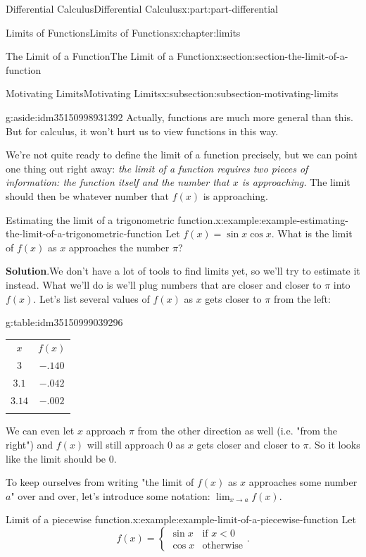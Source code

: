 \documentclass[twoside,10pt,]{tufte-book}
\newcommand{\blocktitlefont}{\relax}
\newcommand{\tabularfont}{\relax}
\numberwithin{equation}{part}
\newcommand{\hrulethin}  {\noalign{\hrule height 0.04em}}
\newcommand{\hrulethick} {\noalign{\hrule height 0.11em}}
\begin{document}
\begin{partptx}{Differential Calculus}{}{Differential Calculus}{}{}{x:part:part-differential}
\begin{chapterptx}{Limits of Functions}{}{Limits of Functions}{}{}{x:chapter:limits}
\begin{sectionptx}{The Limit of a Function}{}{The Limit of a Function}{}{}{x:section:section-the-limit-of-a-function}
\begin{subsectionptx}{Motivating Limits}{}{Motivating Limits}{}{}{x:subsection:subsection-motivating-limits}
\begin{aside}{}{g:aside:idm35150998931392}%
Actually, functions are much more general than this. But for calculus, it won't hurt us to view functions in this way.%
\end{aside}
We're not quite ready to define the limit of a function precisely, but we can point one thing out right away: \emph{the limit of a function requires two pieces of information: the function itself and the number that \(x\) is approaching.} The limit should then be whatever number that \(f(x)\) is approaching.%
\begin{example}{Estimating the limit of a trigonometric function.}{x:example:example-estimating-the-limit-of-a-trigonometric-function}%
Let \(f(x) = \sin x\cos x\). What is the limit of \(f(x)\) as \(x\) approaches the number \(\pi\)?%
\par\smallskip%
\noindent\textbf{\blocktitlefont Solution}.\hypertarget{g:solution:idm35150999041600}{}\quad{}We don't have a lot of tools to find limits yet, so we'll try to estimate it instead. What we'll do is we'll plug numbers that are closer and closer to \(\pi\) into \(f(x)\). Let's list several values of \(f(x)\) as \(x\) gets closer to \(\pi\) from the left:%
\begin{tableptx}{\textbf{}}{g:table:idm35150999039296}{}%
\centering%
{\tabularfont%
\begin{tabular}{cc}\hrulethick
\(x\)&\(f(x)\)\tabularnewline\hrulethin
\(3\)&\(-.140\)\tabularnewline[0pt]
\(3.1\)&\(-.042\)\tabularnewline[0pt]
\(3.14\)&\(-.002\)\tabularnewline\hrulethick
\end{tabular}
}%
\end{tableptx}%
We can even let \(x\) approach \(\pi\) from the other direction as well (i.e. "from the right") and \(f(x)\) will still approach \(0\) as \(x\) gets closer and closer to \(\pi\). So it looks like the limit should be \(0\).%
\end{example}
To keep ourselves from writing "the limit of \(f(x)\) as \(x\) approaches some number \(a\)" over and over, let's introduce some notation: \(\lim_{x\to a}f(x)\).%
\begin{example}{Limit of a piecewise function.}{x:example:example-limit-of-a-piecewise-function}%
Let%
%
\begin{equation*}
f(x) = \begin{cases} \sin x & \text{if $x<0$} \\ \cos x & \text{otherwise} \end{cases}.
\end{equation*}

\end{example}
\end{subsectionptx}
\end{sectionptx}
\end{chapterptx}
\end{partptx}
\end{document}
